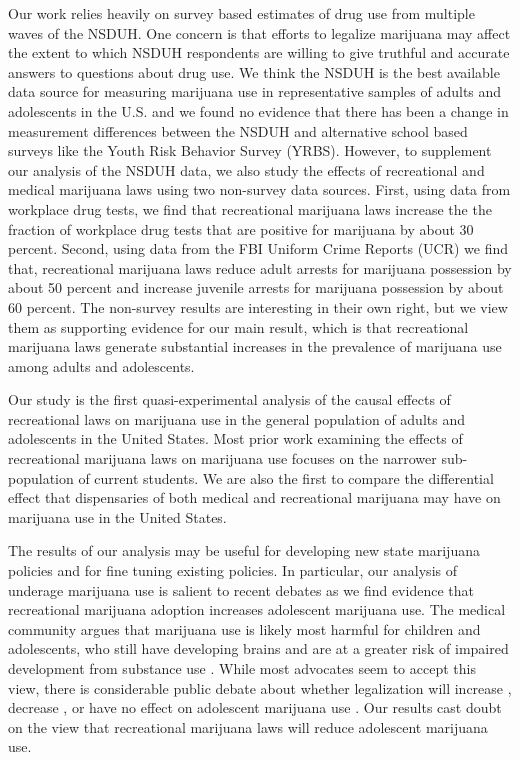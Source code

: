 \documentclass[12pt]{article}%
\begin{document}
Our work relies heavily on survey based estimates of drug use from multiple waves of the NSDUH. One concern is that efforts to legalize marijuana may affect the extent to which NSDUH respondents are willing to give truthful and accurate answers to questions about drug use. We think the NSDUH is the best available data source for measuring marijuana use in representative samples of adults and adolescents in the U.S. and we found no evidence that there has been a change in measurement differences between the NSDUH and alternative school based surveys like the Youth Risk Behavior Survey (YRBS). However, to supplement our analysis of the NSDUH data, we also study the effects of recreational and medical marijuana laws using two non-survey data sources. First, using data from workplace drug tests, we find that recreational marijuana laws increase the the fraction of workplace drug tests that are positive for marijuana by about 30 percent. Second, using data from the FBI Uniform Crime Reports (UCR) we find that, recreational marijuana laws reduce adult arrests for marijuana possession by about 50 percent and increase juvenile arrests for marijuana possession by about 60 percent.  The non-survey results are interesting in their own right, but we view them as supporting evidence for our main result, which is that recreational marijuana laws generate substantial increases in the prevalence of marijuana use among adults and adolescents. 

Our study is the first quasi-experimental analysis of the causal effects of recreational laws on marijuana use in the general population of adults and adolescents in the United States. Most prior work examining the effects of recreational marijuana laws on marijuana use focuses on the narrower sub-population of current students. We are also the first to compare the differential effect that dispensaries of both medical and recreational marijuana may have on marijuana use in the United States.

The results of our analysis may be useful for developing new state marijuana policies and for fine tuning existing policies. In particular, our analysis of underage marijuana use is salient to recent debates as we find evidence that recreational marijuana adoption increases adolescent marijuana use. The medical community argues that marijuana use is likely most harmful for children and adolescents, who still have developing brains and are at a greater risk of impaired development from substance use \citep{AmericanAcademyofPediatrics2015}. While most advocates seem to accept this view, there is considerable public debate about whether legalization will increase \citep{MacleanMJUse2021,cerda2020association, Dudek2019}, decrease  \citep{Blumenfeld2019, Sepeda-Miller2019, Anderson2019}, or have no effect on adolescent marijuana use \citep{Anderson2015,Sarvet2018}. Our results cast doubt on the view that recreational marijuana laws will reduce adolescent marijuana use.
\end{document}
